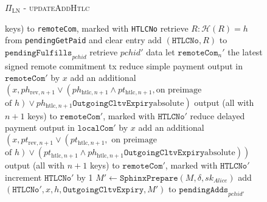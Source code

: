 \begin{figure}[H]
\begin{protocolbox}{$\Pi_{\mathrm{LN}}$ - \textsc{updateAddHtlc}}
\begin{algorithmic}[1]
          keys) to \texttt{remoteCom}, marked with \texttt{HTLCNo}
            \State retrieve $R : \mathcal{H}\left(R\right) = h$ from
            \texttt{pendingGetPaid} and clear entry
            \State add $\left(\mathtt{HTLCNo}, R\right)$ to
            $\mathtt{pendingFulfills}_{\mathit{pchid}}$
           
            \State retrieve $\mathit{pchid}'$ data
            \State let $\mathtt{remoteCom}_n'$ the latest signed remote
            commitment tx
            \State reduce simple payment output in $\mathtt{remoteCom}'$ by $x$
            \State add an additional $\left(x, ph_{\mathrm{rev}, n+1} \vee
            \left(ph_{\mathrm{htlc}, n+1} \wedge pt_{\mathrm{htlc}, n+1}, \text{
            on preimage}\right.\right.$ $\left.\left.\text{of } h\right) \vee
            ph_{\mathrm{htlc}, n+1}\mathtt{OutgoingCltvExpiry} \text{
            absolute}\right)$ output (all with $n+1$ keys) to
            $\mathtt{remoteCom}'$, marked with $\texttt{HTLCNo}'$
            \State reduce delayed payment output in $\mathtt{localCom}'$ by $x$
            \State add an additional $\left(x, pt_{\mathrm{rev}, n+1} \vee
            \left(pt_{\mathrm{htlc}, n+1}, \text{ on preimage}\right.\right.$
            $\left.\left.\text{of } h\right) \vee \left(pt_{\mathrm{htlc}, n+1}
            \wedge ph_{\mathrm{htlc}, n+1}\mathtt{OutgoingCltvExpiry} \text{
            absolute}\right)\right)$ output (all with $n+1$ keys) to
            $\mathtt{remoteCom}'$, marked with $\texttt{HTLCNo}'$
            \State increment $\texttt{HTLCNo}'$ by 1
            \State $M' \gets \mathtt{SphinxPrepare}\left(M, \delta,
            sk_{\mathit{Alice}}\right)$
            \State add $\left(\mathtt{HTLCNo}', x, h,
            \mathtt{OutgoingCltvExpiry}, M'\right)$ to
            $\mathtt{pendingAdds}_{\mathit{pchid}'}$
          \EndIf
        \EndIndent
      \end{algorithmic}
    \end{protocolbox}
    \caption{}
    \label{alg:protocol:pay:updateAddHtlc}
  \end{figure}

